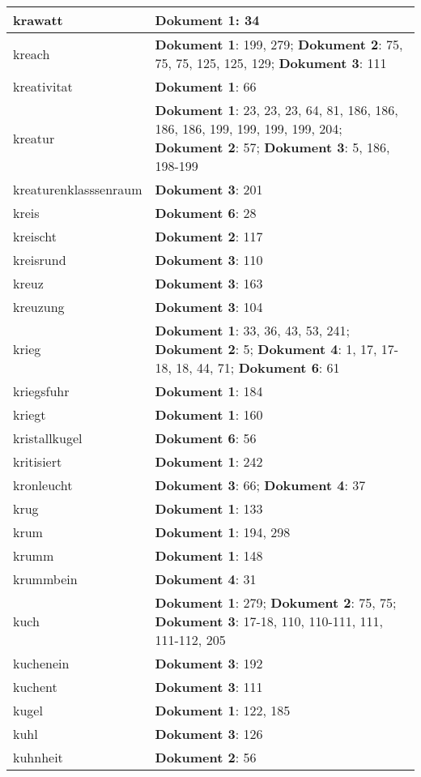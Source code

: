 \documentclass[a5paper]{article}
\begin{document}
\begin{longtable}[l]{|l|p{3in}|}
\hline
krawatt & \textbf{Dokument 1}: 34 \\
\hline
kreach & \textbf{Dokument 1}: 199, 279; \textbf{Dokument 2}: 75, 75, 75, 125, 125, 129; \textbf{Dokument 3}: 111 \\
\hline
kreativitat & \textbf{Dokument 1}: 66 \\
\hline
kreatur & \textbf{Dokument 1}: 23, 23, 23, 64, 81, 186, 186, 186, 186, 199, 199, 199, 199, 204; \textbf{Dokument 2}: 57; \textbf{Dokument 3}: 5, 186, 198-199 \\
\hline
kreaturenklasssenraum & \textbf{Dokument 3}: 201 \\
\hline
kreis & \textbf{Dokument 6}: 28 \\
\hline
kreischt & \textbf{Dokument 2}: 117 \\
\hline
kreisrund & \textbf{Dokument 3}: 110 \\
\hline
kreuz & \textbf{Dokument 3}: 163 \\
\hline
kreuzung & \textbf{Dokument 3}: 104 \\
\hline
krieg & \textbf{Dokument 1}: 33, 36, 43, 53, 241; \textbf{Dokument 2}: 5; \textbf{Dokument 4}: 1, 17, 17-18, 18, 44, 71; \textbf{Dokument 6}: 61 \\
\hline
kriegsfuhr & \textbf{Dokument 1}: 184 \\
\hline
kriegt & \textbf{Dokument 1}: 160 \\
\hline
kristallkugel & \textbf{Dokument 6}: 56 \\
\hline
kritisiert & \textbf{Dokument 1}: 242 \\
\hline
kronleucht & \textbf{Dokument 3}: 66; \textbf{Dokument 4}: 37 \\
\hline
krug & \textbf{Dokument 1}: 133 \\
\hline
krum & \textbf{Dokument 1}: 194, 298 \\
\hline
krumm & \textbf{Dokument 1}: 148 \\
\hline
krummbein & \textbf{Dokument 4}: 31 \\
\hline
kuch & \textbf{Dokument 1}: 279; \textbf{Dokument 2}: 75, 75; \textbf{Dokument 3}: 17-18, 110, 110-111, 111, 111-112, 205 \\
\hline
kuchenein & \textbf{Dokument 3}: 192 \\
\hline
kuchent & \textbf{Dokument 3}: 111 \\
\hline
kugel & \textbf{Dokument 1}: 122, 185 \\
\hline
kuhl & \textbf{Dokument 3}: 126 \\
\hline
kuhnheit & \textbf{Dokument 2}: 56 \\

\end{longtable}
\end{document}
